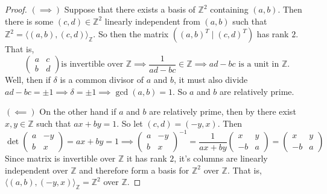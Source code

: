 \documentclass[addpoints,10pt]{exam}
\theoremstyle{plain}
\theoremstyle{definition}
\theoremstyle{plain}
\theoremstyle{plain}
\theoremstyle{definition}
\newcommand{\ZZ}{\ensuremath{\mathbb{Z}}}
\begin{document}
\begin{proof}
$(\implies)$ Suppose that there exists a basis of $\mathbb{Z}^2$ containing $(a,b)$. Then there is some $(c,d)\in \mathbb{Z}^2$ linearly independent from $(a,b)$ such that
$\ZZ^{2}=\langle (a,b),(c,d)\rangle_{\ZZ}$. So then the matrix $((a,b)^{T}\mid (c,d)^{T})$ has rank $2$. That is,
\[
\begin{pmatrix}
a & c\\
b & d
\end{pmatrix}\text{is invertible over $\mathbb{Z}$}\implies \frac{1}{ad-bc}\in \ZZ\implies ad-bc\text{ is a unit in }\ZZ.
\]
Well, then if $\delta$ is a common divisor of $a$ and $b$, it must also divide $ad-bc=\pm 1\implies \delta=\pm 1\implies \gcd(a,b)=1$. So $a$ and $b$ are relatively prime.

$(\impliedby)$ On the other hand if $a$ and $b$ are relatively prime, then by  there exist $x,y\in \mathbb{Z}$ such that
$ax+by=1.$ So let $(c,d)=(-y,x).$
Then
\[
\det
\begin{pmatrix}
a & -y\\
b & x
\end{pmatrix}
=
ax+by=1\implies \begin{pmatrix}
a & -y\\
b & x
\end{pmatrix}^{-1}=\frac{1}{ax+by}\begin{pmatrix}
x & y\\
-b & a
\end{pmatrix}=\begin{pmatrix}
x & y\\
-b & a
\end{pmatrix}
\]
Since matrix is invertible over $\mathbb{Z}$ it has rank $2$, it's columns are linearly independent over $\ZZ$ and therefore form a basis for $\ZZ^{2}$ over $\ZZ$. That is, $\langle (a,b),(-y,x)\rangle_{\ZZ}=\ZZ^{2}$ over $\ZZ$.

\end{proof}
\end{document}
